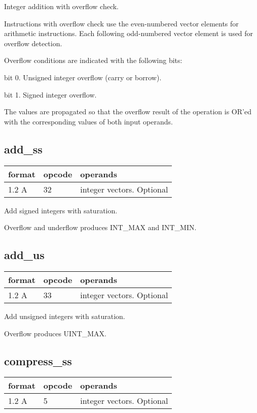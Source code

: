 \documentclass[forwardcom.tex]{subfiles}
\begin{document}
Integer addition with overflow check.
\vv

Instructions with overflow check use the even-numbered vector elements for arithmetic instructions. Each following odd-numbered vector element is used for overflow detection.
\vv

Overflow conditions are indicated with the following bits:
\vv

bit 0. Unsigned integer overflow (carry or borrow).

bit 1. Signed integer overflow.
\vv

The values are propagated so that the overflow result of the operation is OR'ed with the corresponding values of both input operands.
\vv

\subsection{add\_ss}
\label{table:addSsInstruction}
\begin{tabular}{|p{12mm}|p{15mm}|p{100mm}|}
\hline
\bfseries format & \bfseries opcode & \bfseries operands \\ \hline
1.2 A & 32 & integer vectors. Optional \\ \hline
\end{tabular}
\vv

Add signed integers with saturation.

Overflow and underflow produces INT\_MAX and INT\_MIN.
\vv

\subsection{add\_us}
\label{table:addUsInstruction}
\begin{tabular}{|p{12mm}|p{15mm}|p{100mm}|}
\hline
\bfseries format & \bfseries opcode & \bfseries operands \\ \hline
1.2 A & 33 & integer vectors. Optional \\ \hline
\end{tabular}
\vv

Add unsigned integers with saturation.

Overflow produces UINT\_MAX.
\vv

\subsection{compress\_ss}
\label{table:compressSsInstruction}
\begin{tabular}{|p{12mm}|p{15mm}|p{100mm}|}
\hline
\bfseries format & \bfseries opcode & \bfseries operands \\ \hline
1.2 A & 5 & integer vectors. Optional \\ \hline
\end{tabular}
\vv
\end{document}
